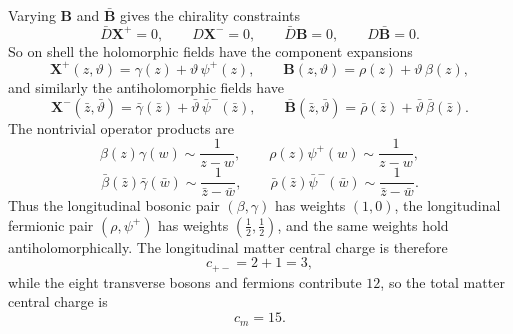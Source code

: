 \documentclass[11pt]{article}
\begin{document}
Varying $\mathbf B$ and $\bar{\mathbf B}$ gives the chirality constraints
\begin{equation}\label{eq:chirality-constraints}
\bar D\mathbf X^+=0,
\qquad
D\mathbf X^-=0,
\qquad
\bar D\mathbf B=0,
\qquad
D\bar{\mathbf B}=0.
\end{equation}
So on shell the holomorphic fields have the component expansions
\begin{equation}\label{eq:holomorphic-components}
\mathbf X^+(z,\vartheta)=\gamma(z)+\vartheta\,\psi^+(z),
\qquad
\mathbf B(z,\vartheta)=\rho(z)+\vartheta\,\beta(z),
\end{equation}
and similarly the antiholomorphic fields have
\begin{equation}\label{eq:antiholomorphic-components}
\mathbf X^-(\bar z,\bar\vartheta)=\bar\gamma(\bar z)+\bar\vartheta\,\bar\psi^-(\bar z),
\qquad
\bar{\mathbf B}(\bar z,\bar\vartheta)=\bar\rho(\bar z)+\bar\vartheta\,\bar\beta(\bar z).
\end{equation}
The nontrivial operator products are
\begin{equation}\label{eq:matter-opes}
\beta(z)\gamma(w)\sim \frac{1}{z-w},
\qquad
\rho(z)\psi^+(w)\sim \frac{1}{z-w},
\end{equation}
\begin{equation}\label{eq:antimatter-opes}
\bar\beta(\bar z)\bar\gamma(\bar w)\sim \frac{1}{\bar z-\bar w},
\qquad
\bar\rho(\bar z)\bar\psi^-(\bar w)\sim \frac{1}{\bar z-\bar w}.
\end{equation}
Thus the longitudinal bosonic pair $(\beta,\gamma)$ has weights $(1,0)$, the longitudinal fermionic pair $(\rho,\psi^+)$ has weights $(\tfrac12,\tfrac12)$, and the same weights hold antiholomorphically. The longitudinal matter central charge is therefore
\begin{equation}\label{eq:longitudinal-central-charge}
c_{+-}=2+1=3,
\end{equation}
while the eight transverse bosons and fermions contribute $12$, so the total matter central charge is
\begin{equation}\label{eq:matter-central-charge}
c_m=15.
\end{equation}
\end{document}
